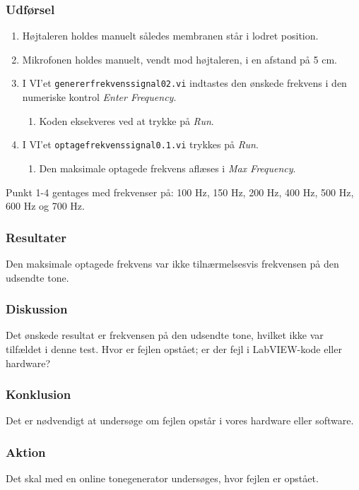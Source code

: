 		\subsubsection{Udførsel}
			\begin{enumerate}
				\item Højtaleren holdes manuelt således membranen står i lodret position. 
				\item Mikrofonen holdes manuelt, vendt mod højtaleren, i en afstand på 5 cm. 
				\item I VI'et \texttt{genererfrekvenssignal02.vi} indtastes den ønskede frekvens i den numeriske kontrol \textit{Enter Frequency}. 
					\begin{enumerate}
						\item Koden eksekveres ved at trykke på \textit{Run}. 
					\end{enumerate} 
				\item I VI'et \texttt{optagefrekvenssignal0.1.vi} trykkes på \textit{Run}. 
					\begin{enumerate}
						\item Den maksimale optagede frekvens aflæses i \textit{Max Frequency}. 
					\end{enumerate}	  
			\end{enumerate}
			
			Punkt 1-4 gentages med frekvenser på: 100 Hz, 150 Hz, 200 Hz, 400 Hz, 500 Hz, 600 Hz og 700 Hz. 
			
			\subsubsection{Resultater}
			Den maksimale optagede frekvens var ikke tilnærmelsesvis frekvensen på den udsendte tone.
			\subsubsection{Diskussion}
			Det ønskede resultat er frekvensen på den udsendte tone, hvilket ikke var tilfældet i denne test. Hvor er fejlen opstået; er der fejl i LabVIEW-kode eller hardware? 
			\subsubsection{Konklusion}
			Det er nødvendigt at undersøge om fejlen opstår i vores hardware eller software. 
			\subsubsection{Aktion}
			Det skal med en online tonegenerator undersøges, hvor fejlen er opstået. 

